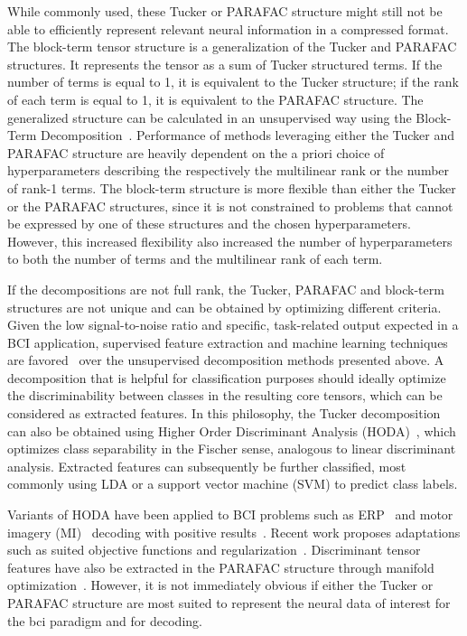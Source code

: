 While commonly used, these Tucker or PARAFAC structure might still not be able to
efficiently represent relevant neural information in a compressed format.
The block-term tensor structure is a generalization of the Tucker and
PARAFAC structures.
It represents the tensor as a sum of Tucker structured terms.
If the number of terms is equal to 1, it is equivalent to the Tucker structure;
if the rank of each term is equal to 1, it is equivalent to the PARAFAC
structure.
The generalized structure can be calculated in an unsupervised way using
the Block-Term Decomposition~\cite{DeLathauwer2008,DeLathauwer2008a,DeLathauwer2008b,Rontogiannis2021}.
Performance of methods leveraging either the Tucker and PARAFAC structure are
heavily dependent on the a priori choice of hyperparameters describing the
respectively the multilinear rank or the number of rank-1 terms.
The block-term structure is more flexible than either the Tucker or the PARAFAC
structures, since it is not constrained to problems that cannot be expressed by
one of these structures and the chosen hyperparameters.
However, this increased flexibility also increased the number of
hyperparameters to both the number of terms and the multilinear rank of each term.

If the decompositions are not full rank, the Tucker, PARAFAC and block-term
structures are not unique and can be obtained by optimizing different criteria.
Given the low signal-to-noise ratio and specific, task-related output expected
in a BCI application, supervised feature extraction and machine learning techniques are
favored~\cite{Lotte2018} over the unsupervised decomposition methods presented
above.
A decomposition that is helpful for classification purposes should ideally optimize
the discriminability between classes in the resulting core tensors, which can
be considered as extracted features.
In this philosophy, the Tucker decomposition can also be obtained
using Higher Order Discriminant Analysis
(HODA)~\cite{Yan2005,Phan2010,Froelich2018}, which optimizes class separability in the Fischer sense, analogous to linear
discriminant analysis.
Extracted features can subsequently be further classified, most commonly
using LDA or a support vector machine (SVM) to predict class labels.


Variants of HODA have been applied to BCI problems such as
ERP~\cite{Onishi2012,Higashi2016} and motor imagery (MI)~\cite{Liu2015,Cai2021}
decoding with positive results~\cite{Lotte2018}.
Recent work proposes adaptations such as suited objective
functions and regularization~\cite{Jamshidi2017,Jorajuria2022,Aghili2023}.
Discriminant tensor features have also be extracted
in the PARAFAC structure through manifold optimization~\cite{Froelich2018}.
However, it is not immediately obvious if either the Tucker or PARAFAC
structure are most suited to represent the neural data of interest for the \ac{bci}
paradigm and for decoding.

